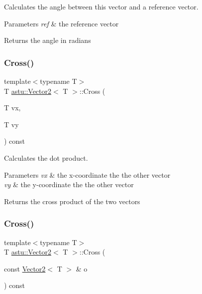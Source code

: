 Calculates the angle between this vector and a reference vector.


\begin{DoxyParams}{Parameters}
{\em ref} & the reference vector \\
\hline
\end{DoxyParams}
\begin{DoxyReturn}{Returns}
the angle in radians 
\end{DoxyReturn}
\mbox{\label{classastu_1_1Vector2_ad7245590bd3a503f0c388cad9008789b}} 
\subsubsection{\texorpdfstring{Cross()}{Cross()}\hspace{0.1cm}{\footnotesize\ttfamily [1/2]}}
{\footnotesize\ttfamily template$<$typename T$>$ \\
T \hyperlink{classastu_1_1Vector2}{astu\+::\+Vector2}$<$ T $>$\+::Cross (\begin{DoxyParamCaption}\item[{T}]{vx,  }\item[{T}]{vy }\end{DoxyParamCaption}) const\hspace{0.3cm}{\ttfamily [inline]}}

Calculates the dot product.


\begin{DoxyParams}{Parameters}
{\em vx} & the x-\/coordinate the the other vector \\
\hline
{\em vy} & the y-\/coordinate the the other vector \\
\hline
\end{DoxyParams}
\begin{DoxyReturn}{Returns}
the cross product of the two vectors 
\end{DoxyReturn}
\mbox{\label{classastu_1_1Vector2_ab39f342813a6f5f21a533a4345e1336c}} 
\subsubsection{\texorpdfstring{Cross()}{Cross()}\hspace{0.1cm}{\footnotesize\ttfamily [2/2]}}
{\footnotesize\ttfamily template$<$typename T$>$ \\
T \hyperlink{classastu_1_1Vector2}{astu\+::\+Vector2}$<$ T $>$\+::Cross (\begin{DoxyParamCaption}\item[{const \hyperlink{classastu_1_1Vector2}{Vector2}$<$ T $>$ \&}]{o }\end{DoxyParamCaption}) const\hspace{0.3cm}{\ttfamily [inline]}}

